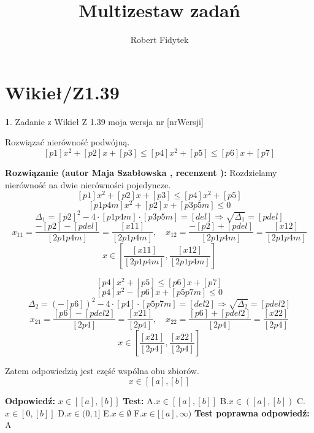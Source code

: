 \documentclass[12pt, a4paper]{article}
\title{Multizestaw zadań}
\author{Robert Fidytek}
\date{}
\theoremstyle{definition} %
\newtheorem{zad}{}
\newcommand{\kategoria}[1]{\section{#1}} %
\newcommand{\zadStart}[1]{\begin{zad}#1\newline} %
\newcommand{\zadStop}{\end{zad}}   %
\newcommand{\rozwStart}[2]{\noindent \textbf{Rozwiązanie (autor #1 , recenzent #2): }\newline} %
\newcommand{\rozwStop}{\newline}                                            %
\newcommand{\odpStart}{\noindent \textbf{Odpowiedź:}\newline}    %
\newcommand{\odpStop}{\newline}                                             %
\newcommand{\testStart}{\noindent \textbf{Test:}\newline} %
\newcommand{\testStop}{\newline} %
\newcommand{\kluczStart}{\noindent \textbf{Test poprawna odpowiedź:}\newline} %
\newcommand{\kluczStop}{\newline} %
\begin{document}
\maketitle


\kategoria{Wikieł/Z1.39}
\zadStart{Zadanie z Wikieł Z 1.39 moja wersja nr [nrWersji]}

Rozwiązać nierówność podwójną.
$$[p1]x^{2}+[p2]x+[p3]\leq [p4]x^{2}+[p5] \leq [p6]x+[p7]$$
\zadStop

\rozwStart{Maja Szabłowska}{}
Rozdzielamy nierówność na dwie nierówności pojedyncze.
$$[p1]x^{2}+[p2]x+[p3]\leq [p4]x^{2}+[p5] $$
$$[p1p4m]x^{2}+[p2]x+[p3p5m]\leq0$$
$$\Delta_{1}=[p2]^{2}-4\cdot[p1p4m]\cdot[p3p5m]=[del] \Rightarrow \sqrt{\Delta_{1}}=[pdel]$$
$$x_{11}=\frac{-[p2]-[pdel]}{[2p1p4m]}=\frac{[x11]}{[2p1p4m]}, \quad x_{12}=\frac{-[p2]+[pdel]}{[2p1p4m]}=\frac{[x12]}{[2p1p4m]}$$
$$x\in\left[\frac{[x11]}{[2p1p4m]},\frac{[x12]}{[2p1p4m]}\right]$$

$$[p4]x^{2}+[p5] \leq [p6]x+[p7]$$
$$[p4]x^{2}-[p6]x+[p5p7m]\leq0$$
$$\Delta_{2}=(-[p6])^{2}-4\cdot[p4]\cdot[p5p7m]=[del2] \Rightarrow \sqrt{\Delta_{2}}=[pdel2]$$
$$x_{21}=\frac{[p6]-[pdel2]}{[2p4]}=\frac{[x21]}{[2p4]}, \quad x_{22}=\frac{[p6]+[pdel2]}{[2p4]}=\frac{[x22]}{[2p4]}$$
$$x\in\left[\frac{[x21]}{[2p4]}, \frac{[x22]}{[2p4]}\right]$$

Zatem odpowiedzią jest część wspólna obu zbiorów.
$$x\in[[a],[b]]$$
\rozwStop


\odpStart
$x\in[[a],[b]]$
\odpStop
\testStart
A.$x\in[[a],[b]]$
B.$x\in([a],[b])$
C.$x\in[0,[b]]$
D.$x\in(0,1]$
E.$x\in\emptyset$
F.$x\in[[a],\infty)$
\testStop
\kluczStart
A
\kluczStop
\end{document}
